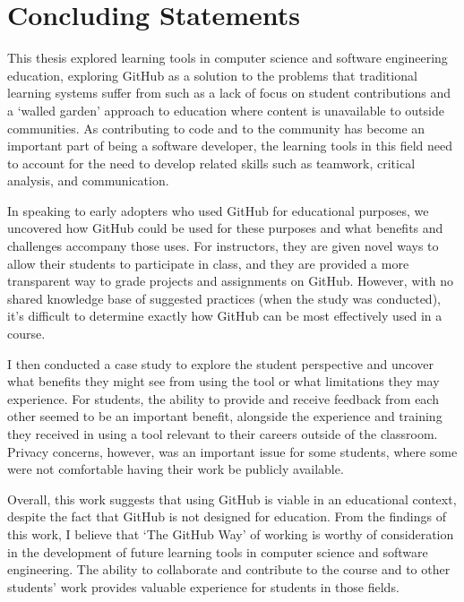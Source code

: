 \section{Concluding Statements}
This thesis explored learning tools in computer science and software engineering education, exploring GitHub as a solution to the problems that traditional learning systems suffer from such as a lack of focus on student contributions and a `walled garden' approach to education where content is unavailable to outside communities. As contributing to code and to the community has become an important part of being a software developer, the learning tools in this field need to account for the need to develop related skills such as teamwork, critical analysis, and communication.

In speaking to early adopters who used GitHub for educational purposes, we uncovered how GitHub could be used for these purposes and what benefits and challenges accompany those uses. For instructors, they are given novel ways to allow their students to participate in class, and they are provided a more transparent way to grade projects and assignments on GitHub. However, with no shared knowledge base of suggested practices (when the study was conducted), it's difficult to determine exactly how GitHub can be most effectively used in a course.

I then conducted a case study to explore the student perspective and uncover what benefits they might see from using the tool or what limitations they may experience. For students, the ability to provide and receive feedback from each other seemed to be an important benefit, alongside the experience and training they received in using a tool relevant to their careers outside of the classroom. Privacy concerns, however, was an important issue for some students, where some were not comfortable having their work be publicly available.

Overall, this work suggests that using GitHub is viable in an educational context, despite the fact that GitHub is not designed for education. From the findings of this work, I believe that `The GitHub Way' of working is worthy of consideration in the development of future learning tools in computer science and software engineering. The ability to collaborate and contribute to the course and to other students' work provides valuable experience for students in those fields.
